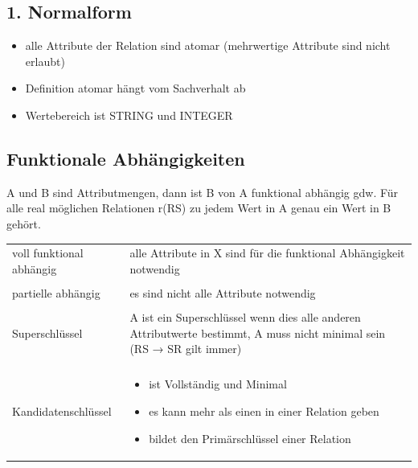 \documentclass[a4paper]{article}
\begin{document}
\subsection{1. Normalform}
\begin{itemize}
    \item alle Attribute der Relation sind atomar (mehrwertige Attribute sind nicht erlaubt)
    \item Definition atomar hängt vom Sachverhalt ab
    \item Wertebereich ist STRING und INTEGER
\end{itemize}

\subsection{Funktionale Abhängigkeiten}
A und B sind Attributmengen, dann ist B von A funktional abhängig gdw. Für alle real möglichen Relationen r(RS) zu jedem Wert in A genau ein Wert in B gehört.

\vspace{5mm}

\begin{tabular}{l p{12cm}}
     voll funktional abhängig & alle Attribute in X sind für die funktional Abhängigkeit notwendig \\
     & \\
     partielle abhängig & es sind nicht alle Attribute notwendig\\
     & \\
     Superschlüssel & A ist ein Superschlüssel wenn dies alle anderen Attributwerte bestimmt, A muss nicht minimal sein (RS → SR gilt immer)\\
     & \\
     Kandidatenschlüssel & \begin{itemize}
         \item ist Vollständig und Minimal
         \item es kann mehr als einen in einer Relation geben
         \item bildet den Primärschlüssel einer Relation
     \end{itemize} \\
\end{tabular}
\end{document}
